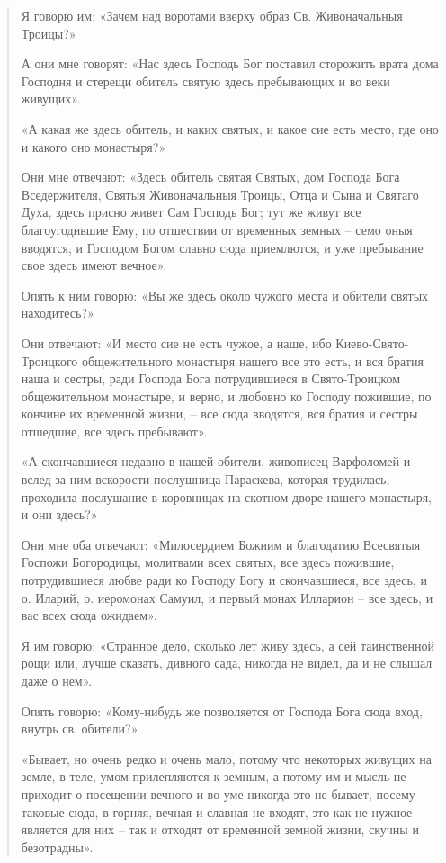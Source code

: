 \begin{quotation}
Я говорю им: «Зачем над воротами вверху образ Св. Живоначальныя Троицы?» 

А они мне говорят: «Нас здесь Господь Бог поставил сторожить врата дома Господня и стерещи обитель святую здесь пребывающих и во веки живущих». 

«А какая же здесь обитель, и каких святых, и какое сие есть место, где оно и какого оно монастыря?» 

Они мне отвечают: «Здесь обитель святая Святых, дом Господа Бога Вседержителя, Святыя Живоначальныя Троицы, Отца и Сына и Святаго Духа, здесь присно живет Сам Господь Бог; тут же живут все благоугодившие Ему, по отшествии от временных земных – семо оныя вводятся, и Господом Богом славно сюда приемлются, и уже пребывание свое здесь имеют вечное». 

Опять к ним говорю: «Вы же здесь около чужого места и обители святых находитесь?» 

Они отвечают: «И место сие не есть чужое, а наше, ибо Киево-Свято-Троицкого общежительного монастыря нашего все это есть, и вся братия наша и сестры, ради Господа Бога потрудившиеся в Свято-Троицком общежительном монастыре, и верно, и любовно ко Господу пожившие, по кончине их временной жизни, – все сюда вводятся, вся братия и сестры отшедшие, все здесь пребывают». 

«А скончавшиеся недавно в нашей обители, живописец Варфоломей и вслед за ним вскорости послушница Параскева, которая трудилась, проходила послушание в коровницах на скотном дворе нашего монастыря, и они здесь?» 

Они мне оба отвечают: «Милосердием Божиим и благодатию Всесвятыя Госпожи Богородицы, молитвами всех святых, все здесь пожившие, потрудившиеся любве ради ко Господу Богу и скончавшиеся, все здесь, и о. Иларий, о. иеромонах Самуил, и первый монах Илларион – все здесь, и вас всех сюда ожидаем».

Я им говорю: «Странное дело, сколько лет живу здесь, а сей таинственной рощи или, лучше сказать, дивного сада, никогда не видел, да и не слышал даже о нем». 

Опять говорю: «Кому-нибудь же позволяется от Господа Бога сюда вход, внутрь св. обители?»

«Бывает, но очень редко и очень мало, потому что некоторых живущих на земле, в теле, умом прилепляются к земным, а потому им и мысль не приходит о посещении вечного и во уме никогда это не бывает, посему таковые сюда, в горняя, вечная и славная не входят, это как не нужное является для них – так и отходят от временной земной жизни, скучны и безотрадны». 


\end{quotation}
